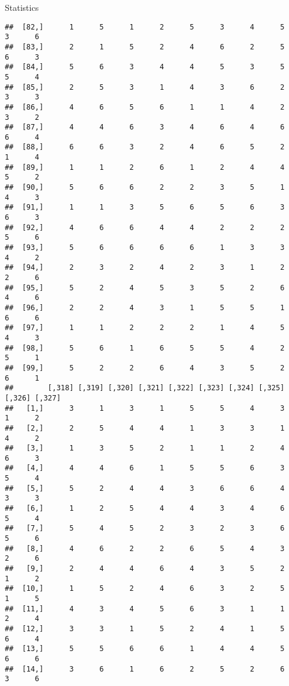 \documentclass[
  ignorenonframetext,
]{beamer}
\begin{document}
\begin{frame}[fragile]{Statistics}
\begin{verbatim}
##  [82,]      1      5      1      2      5      3      4      5      3      6
##  [83,]      2      1      5      2      4      6      2      5      6      3
##  [84,]      5      6      3      4      4      5      3      5      5      4
##  [85,]      2      5      3      1      4      3      6      2      3      3
##  [86,]      4      6      5      6      1      1      4      2      3      2
##  [87,]      4      4      6      3      4      6      4      6      6      4
##  [88,]      6      6      3      2      4      6      5      2      1      4
##  [89,]      1      1      2      6      1      2      4      4      5      2
##  [90,]      5      6      6      2      2      3      5      1      4      3
##  [91,]      1      1      3      5      6      5      6      3      6      3
##  [92,]      4      6      6      4      4      2      2      2      5      6
##  [93,]      5      6      6      6      6      1      3      3      4      2
##  [94,]      2      3      2      4      2      3      1      2      2      6
##  [95,]      5      2      4      5      3      5      2      6      4      6
##  [96,]      2      2      4      3      1      5      5      1      6      6
##  [97,]      1      1      2      2      2      1      4      5      4      3
##  [98,]      5      6      1      6      5      5      4      2      5      1
##  [99,]      5      2      2      6      4      3      5      2      6      1
##        [,318] [,319] [,320] [,321] [,322] [,323] [,324] [,325] [,326] [,327]
##   [1,]      3      1      3      1      5      5      4      3      1      2
##   [2,]      2      5      4      4      1      3      3      1      4      2
##   [3,]      1      3      5      2      1      1      2      4      6      3
##   [4,]      4      4      6      1      5      5      6      3      5      4
##   [5,]      5      2      4      4      3      6      6      4      3      3
##   [6,]      1      2      5      4      4      3      4      6      5      4
##   [7,]      5      4      5      2      3      2      3      6      5      6
##   [8,]      4      6      2      2      6      5      4      3      2      6
##   [9,]      2      4      4      6      4      3      5      2      1      2
##  [10,]      1      5      2      4      6      3      2      5      1      5
##  [11,]      4      3      4      5      6      3      1      1      2      4
##  [12,]      3      3      1      5      2      4      1      5      6      4
##  [13,]      5      5      6      6      1      4      4      5      6      6
##  [14,]      3      6      1      6      2      5      2      6      3      6

\end{verbatim}
\end{frame}
\end{document}
